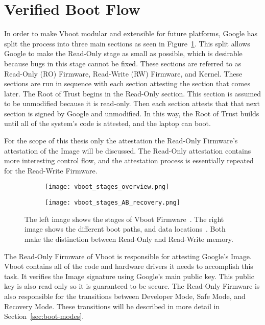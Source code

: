 \section{Verified Boot Flow}

In order to make Vboot modular and extensible for future platforms, Google has split the process into three main sections as seen in Figure~\ref{fig:vboot_stages_overview}.
This split allows Google to make the Read-Only stage as small as possible, which
is desirable because bugs in this stage cannot be fixed.
These sections are referred to as Read-Only (RO) Firmware, Read-Write
(RW) Firmware, and Kernel.
These sections are run in sequence with each section attesting the section that comes later.
The Root of Trust begins in the Read-Only section.
This section is assumed to be unmodified because it is read-only.
Then each section attests that that next section is signed by Google and
unmodified. 
In this way, the Root of Trust builds until all of the system's code is
attested, and the laptop can boot.

For the scope of this thesis only the attestation the Read-Only Firmware's
attestation of the Image will be discussed.
The Read-Only attestation contains more interesting control flow, and
the attestation process is essentially repeated for the Read-Write Firmware.

\begin{figure}
\begin{subfigure}{.4\textwidth}
  \centering
  \texttt{[image: vboot\_stages\_overview.png]}
\end{subfigure}
\begin{subfigure}{.60\textwidth}
  \centering
  \texttt{[image: vboot\_stages\_AB\_recovery.png]}
\end{subfigure}
\caption[Verified Boot Stages]{The left image shows the stages of Vboot
    Firmware~\cite{fw-summit}. The right image
    shows the different boot paths, and data locations~\cite{fw-summit}. Both make the distinction
between Read-Only and Read-Write memory.}
\label{fig:vboot_stages_overview}
\end{figure}

The Read-Only Firmware of Vboot is responsible for attesting Google's Image. 
Vboot contains all of the code and hardware drivers it needs to accomplish this task.
It verifies the Image signature using Google's main public key.
This public key is also read only so it is guaranteed to be secure.
The Read-Only Firmware is also responsible for the transitions between Developer Mode, Safe Mode, and Recovery Mode.
These transitions will be described in more detail in Section~\ref{sec:boot-modes}.


